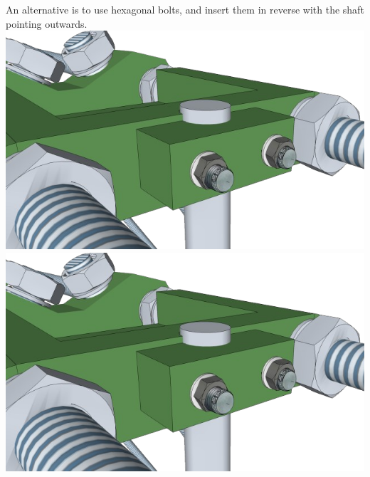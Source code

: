 \documentclass[twoside,a4paper,titlepage]{memoir}
\begin{document}
	An alternative is to use hexagonal bolts, and insert them in reverse with the shaft pointing outwards.\\
	\includegraphics[width=1\linewidth]{graphics/ch8_5_4.png}
	\includegraphics[width=1\linewidth]{graphics/ch8_5_5.png}
	
\end{document}
